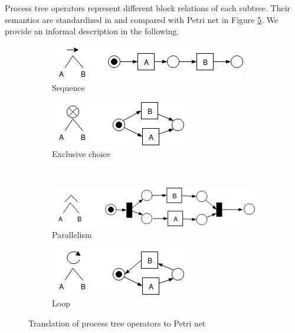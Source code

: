 Process tree operators represent different block relations of each subtree. Their semantics are standardized in \cite{vanderAalst:2016:PMD:2948762, Buijs2012OnTR} and compared with Petri net in Figure \ref{fig:pn_pt_correspondings}\cite{Buijs2012OnTR}. We provide an informal description in the following.
\begin{figure}[!h]
	\centering
	\begin{subfigure}[b]{0.45\textwidth}
		\centering
		\includegraphics[width=\linewidth]{figures/preliminary/PT_PN_corresponding_01_seq_PN.png}
		\caption{Sequence}
		\label{fig:pt_pn_seq}
	\end{subfigure}%
	\quad
	\begin{subfigure}[b]{0.45\textwidth}
		\centering
		\includegraphics[width=\linewidth]{figures/preliminary/PT_PN_corresponding_02_xor_PN.png}
		\caption{Exclusive choice}
		\label{fig:pt_pn_xor}
	\end{subfigure}%
	\\ %
	\begin{subfigure}[b]{0.45\textwidth}
		\centering
		\includegraphics[width=\linewidth]{figures/preliminary/PT_PN_corresponding_03_and_PN.png}
		\caption{ Parallelism }
		\label{fig:pt_pn_and}
	\end{subfigure}%
	\quad
	\begin{subfigure}[b]{0.45\textwidth}
		\centering
		\includegraphics[width=\linewidth]{figures/preliminary/PT_PN_corresponding_04_loop_PN.png}
		\caption{Loop}
		\label{fig:pt_pn_loop}
	\end{subfigure}%
	\caption{Translation of process tree operators to Petri net}
	\label{fig:pn_pt_correspondings}
\end{figure}
